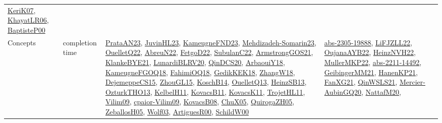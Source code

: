 {\begin{longtable}{lp{3cm}>{\raggedright}p{6cm}>{\raggedright}p{6cm}p{8cm}}
\href{papers/KeriK07.pdf}{KeriK07}\cite{KeriK07}, \href{articles/KhayatLR06.pdf}{KhayatLR06}\cite{KhayatLR06}, \href{articles/BaptisteP00.pdf}{BaptisteP00}\cite{BaptisteP00}\\
Concepts & completion time & \href{articles/PrataAN23.pdf}{PrataAN23}\cite{PrataAN23}, \href{papers/JuvinHL23.pdf}{JuvinHL23}\cite{JuvinHL23}, \href{papers/KameugneFND23.pdf}{KameugneFND23}\cite{KameugneFND23}, \href{papers/Mehdizadeh-Somarin23.pdf}{Mehdizadeh-Somarin23}\cite{Mehdizadeh-Somarin23}, \href{papers/OuelletQ22.pdf}{OuelletQ22}\cite{OuelletQ22}, \href{articles/AbreuN22.pdf}{AbreuN22}\cite{AbreuN22}, \href{articles/FetgoD22.pdf}{FetgoD22}\cite{FetgoD22}, \href{articles/SubulanC22.pdf}{SubulanC22}\cite{SubulanC22}, \href{papers/ArmstrongGOS21.pdf}{ArmstrongGOS21}\cite{ArmstrongGOS21}, \href{papers/KlankeBYE21.pdf}{KlankeBYE21}\cite{KlankeBYE21}, \href{articles/LunardiBLRV20.pdf}{LunardiBLRV20}\cite{LunardiBLRV20}, \href{articles/QinDCS20.pdf}{QinDCS20}\cite{QinDCS20}, \href{papers/ArbaouiY18.pdf}{ArbaouiY18}\cite{ArbaouiY18}, \href{papers/KameugneFGOQ18.pdf}{KameugneFGOQ18}\cite{KameugneFGOQ18}, \href{articles/FahimiOQ18.pdf}{FahimiOQ18}\cite{FahimiOQ18}, \href{articles/GedikKEK18.pdf}{GedikKEK18}\cite{GedikKEK18}, \href{articles/ZhangW18.pdf}{ZhangW18}\cite{ZhangW18}, \href{papers/DejemeppeCS15.pdf}{DejemeppeCS15}\cite{DejemeppeCS15}, \href{papers/ZhouGL15.pdf}{ZhouGL15}\cite{ZhouGL15}, \href{papers/KoschB14.pdf}{KoschB14}\cite{KoschB14}, \href{papers/OuelletQ13.pdf}{OuelletQ13}\cite{OuelletQ13}, \href{articles/HeinzSB13.pdf}{HeinzSB13}\cite{HeinzSB13}, \href{articles/OzturkTHO13.pdf}{OzturkTHO13}\cite{OzturkTHO13}, \href{articles/KelbelH11.pdf}{KelbelH11}\cite{KelbelH11}, \href{articles/KovacsB11.pdf}{KovacsB11}\cite{KovacsB11}, \href{articles/KovacsK11.pdf}{KovacsK11}\cite{KovacsK11}, \href{articles/TrojetHL11.pdf}{TrojetHL11}\cite{TrojetHL11}, \href{papers/Vilim09.pdf}{Vilim09}\cite{Vilim09}, \href{papers/cpaior-Vilim09.pdf}{cpaior-Vilim09}\cite{cpaior-Vilim09}, \href{articles/KovacsB08.pdf}{KovacsB08}\cite{KovacsB08}, \href{papers/ChuX05.pdf}{ChuX05}\cite{ChuX05}, \href{papers/QuirogaZH05.pdf}{QuirogaZH05}\cite{QuirogaZH05}, \href{articles/ZeballosH05.pdf}{ZeballosH05}\cite{ZeballosH05}, \href{papers/Wolf03.pdf}{Wolf03}\cite{Wolf03}, \href{articles/ArtiguesR00.pdf}{ArtiguesR00}\cite{ArtiguesR00}, \href{articles/SchildW00.pdf}{SchildW00}\cite{SchildW00} & \href{articles/abs-2305-19888.pdf}{abs-2305-19888}\cite{abs-2305-19888}, \href{papers/LiFJZLL22.pdf}{LiFJZLL22}\cite{LiFJZLL22}, \href{papers/OujanaAYB22.pdf}{OujanaAYB22}\cite{OujanaAYB22}, \href{articles/HeinzNVH22.pdf}{HeinzNVH22}\cite{HeinzNVH22}, \href{articles/MullerMKP22.pdf}{MullerMKP22}\cite{MullerMKP22}, \href{articles/abs-2211-14492.pdf}{abs-2211-14492}\cite{abs-2211-14492}, \href{papers/GeibingerMM21.pdf}{GeibingerMM21}\cite{GeibingerMM21}, \href{papers/HanenKP21.pdf}{HanenKP21}\cite{HanenKP21}, \href{articles/FanXG21.pdf}{FanXG21}\cite{FanXG21}, \href{articles/QinWSLS21.pdf}{QinWSLS21}\cite{QinWSLS21}, \href{papers/Mercier-AubinGQ20.pdf}{Mercier-AubinGQ20}\cite{Mercier-AubinGQ20}, \href{papers/NattafM20.pdf}{NattafM20}\cite{NattafM20}, 
\end{longtable}}
